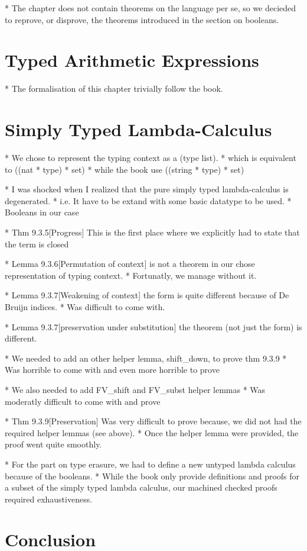 \documentclass[a4paper, oneside, 12pt, titlepage]{article}
\begin{document}
  * The chapter does not contain theorems on the language per se, so we decieded to reprove, or
    disprove, the theorems introduced in the section on booleans.

\section{Typed Arithmetic Expressions}
\label{sec:typed-arith-expr}

  * The formalisation of this chapter trivially follow the book.

\section{Simply Typed Lambda-Calculus}
\label{sec:simply-typed-lambda-calculus}

  * We chose to represent the typing context as a (type list).
    * which is equivalent to ((nat * type) * set)
    * while the book use ((string * type) * set)

  * I was shocked when I realized that the pure simply typed lambda-calculus is degenerated.
    * i.e. It have to be extand with some basic datatype to be used.
    * Booleans in our case

  * Thm 9.3.5[Progress] This is the first place where we explicitly had to state that the term is
    closed

  * Lemma 9.3.6[Permutation of context] is not a theorem in our chose representation of typing
    context.
    * Fortunatly, we manage without it.

  * Lemma 9.3.7[Weakening of context] the form is quite different because of De Bruijn indices.
    * Was difficult to come with.

  * Lemma 9.3.7[preservation under substitution] the theorem (not just the form) is different.

  * We needed to add an other helper lemma, shift\_down, to prove thm 9.3.9
    * Was horrible to come with and even more horrible to prove

  * We also needed to add FV\_shift and FV\_subst helper lemmas
    * Was moderatly difficult to come with and prove

  * Thm 9.3.9[Preservation] Was very difficult to prove because, we did not had the required helper
    lemmas (see above).
    * Once the helper lemma were provided, the proof went quite smoothly.

  * For the part on type erasure, we had to define a new untyped lambda calculus because of the
    booleans.
    * While the book only provide definitions and proofs for a subset of the simply typed lambda
      calculus, our machined checked proofs required exhaustiveness.

\section{Conclusion}
\end{document}
